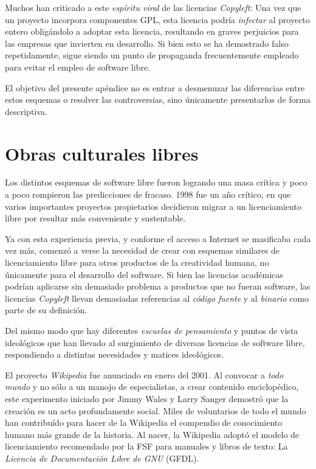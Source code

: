 \documentclass[11pt,fleqn]{book} %
\begin{document}
Muchos han criticado a este \emph{espíritu viral} de las licencias
\emph{Copyleft}: Una vez que un proyecto incorpora componentes GPL, esta
licencia podría \emph{infectar} al proyecto entero obligándolo a adoptar
esta licencia, resultando en graves perjuicios para las empresas que
invierten en desarrollo. Si bien esto se ha demostrado falso
repetidamente, sigue siendo un punto de propaganda frecuentemente
empleado para evitar el empleo de software libre.

El objetivo del presente apéndice no es entrar a desmenuzar las
diferencias entre estos esquemas o resolver las controversias, sino
únicamente presentarlos de forma descriptiva.
\section{Obras culturales libres}
\label{sec-8-2}
\label{SL_obras_cult_lib}


Los distintos esquemas de software libre fueron logrando una masa
crítica y poco a poco rompieron las predicciones de fracaso. 1998 fue
un año crítico, en que varios importantes proyectos propietarios
decidieron migrar a un licenciamiento libre por resultar más
conveniente y sustentable.

Ya con esta experiencia previa, y conforme el acceso a Internet se
masificaba cada vez más, comenzó a verse la necesidad de crear con
esquemas similares de licenciamiento libre para otros productos de la
creatividad humana, no únicamente para el desarrollo del
software. Si bien las licencias académicas podrían aplicarse sin
demasiado problema a productos que no fueran software, las licencias
\emph{Copyleft} llevan demasiadas referencias al \emph{código fuente} y al
\emph{binario} como parte de su definición.

Del mismo modo que hay diferentes \emph{escuelas de pensamiento} y puntos
de vista ideológicos que han llevado al surgimiento de diversas
licencias de software libre, respondiendo a distintas necesidades y
matices ideológicos.

El proyecto \emph{Wikipedia} fue anunciado en enero del 2001. Al convocar a
\emph{todo mundo} y no sólo a un manojo de especialistas, a crear contenido
enciclopédico, este experimento iniciado por Jimmy Wales y Larry
Sanger demostró que la creación es un acto profundamente social. Miles
de voluntarios de todo el mundo han contribuído para hacer de la
Wikipedia el compendio de conocimiento humano más grande de la
historia. Al nacer, la Wikipedia adoptó el modelo de licenciamiento
recomendado por la FSF para manuales y libros de texto: La \emph{Licencia de Documentación Libre de GNU} (GFDL).
\end{document}
